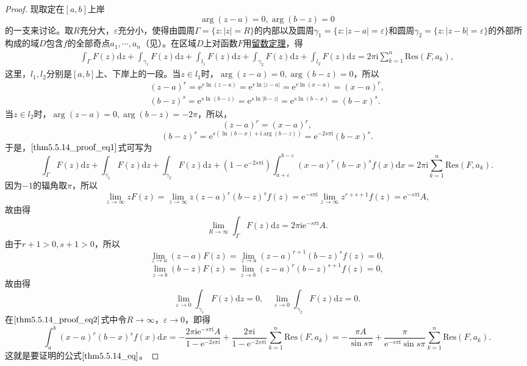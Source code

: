 \documentclass[../../main.tex]{subfiles}%
\begin{document}
\begin{proof}
现取定在\([a, b]\)上岸
\[
\arg(z - a) = 0, \arg(b - z) = 0
\]
的一支来讨论。取\( R \)充分大，\( \varepsilon \)充分小，使得由圆周\( \Gamma = \{ z : |z| = R \} \)的内部以及圆周\( \gamma_1 = \{ z : |z - a| = \varepsilon \} \)和圆周\( \gamma_2 = \{ z : |z - b| = \varepsilon \} \)的外部所构成的域\( D \)包含\( f \)的全部奇点\( a_1, \cdots, a_n \)（见）。在区域\( D \)上对函数\( F \)用\hyperref[theorem:留数定理(残数定理)-定理5.4.9]{留数定理}，得
\begin{align}
\int_{\Gamma} F(z) \mathrm{d}z + \int_{\gamma_1} F(z) \mathrm{d}z + \int_{l_1} F(z) \mathrm{d}z + \int_{\gamma_2} F(z) \mathrm{d}z + \int_{l_2} F(z) \mathrm{d}z
= 2\pi \mathrm{i} \sum_{k = 1}^{n} \mathrm{Res}(F, a_k), \label{thm5.5.14_proof_eq1}
\end{align}
这里，\( l_1, l_2 \)分别是\([a, b]\)上、下岸上的一段。当\( z \in l_1 \)时，\(\arg(z - a) = 0, \arg(b - z) = 0\)，所以
\begin{gather*}
(z - a)^r = \mathrm{e}^{r \ln(z - a)} = \mathrm{e}^{r \ln|z - a|}
= \mathrm{e}^{r \ln(x - a)} = (x - a)^r,
\\
(b - z)^s = \mathrm{e}^{s \ln(b - z)} = \mathrm{e}^{s \ln|b - z|}
= \mathrm{e}^{s \ln(b - x)} = (b - x)^s.
\end{gather*}
当\( z \in l_2 \)时，\(\arg(z - a) = 0, \arg(b - z) = -2\pi\)，所以，
\[
(z - a)^r = (x - a)^r,
\]
\[
(b - z)^s = \mathrm{e}^{s(\ln(b - x) + \mathrm{i} \arg(b - z))}
= \mathrm{e}^{-2s\pi \mathrm{i}} (b - x)^s.
\]
于是，\(\eqref{thm5.5.14_proof_eq1}\)式可写为
\[
\int_{\Gamma} F(z) \mathrm{d}z + \int_{\gamma_1} F(z) \mathrm{d}z + \int_{\gamma_2} F(z) \mathrm{d}z
+ (1 - \mathrm{e}^{-2s\pi \mathrm{i}}) \int_{a + \varepsilon}^{b - \varepsilon} (x - a)^r (b - x)^s f(x) \mathrm{d}x
= 2\pi \mathrm{i} \sum_{k = 1}^{n} \mathrm{Res}(F, a_k). \label{thm5.5.14_proof_eq2}
\]
因为\(-1\)的辐角取\(\pi\)，所以
\[
\lim_{z \to \infty} z F(z) = \lim_{z \to \infty} z (z - a)^r (b - z)^s f(z)
= \mathrm{e}^{-s\pi \mathrm{i}} \lim_{z \to \infty} z^{r + s + 1} f(z)
= \mathrm{e}^{-s\pi \mathrm{i}} A,
\]
故由得
\[
\lim_{R \to \infty} \int_{\Gamma} F(z) \mathrm{d}z = 2\pi \mathrm{i} \mathrm{e}^{-s\pi \mathrm{i}} A.
\]
由于\( r + 1 > 0, s + 1 > 0 \)，所以
\[
\lim_{z \to a} (z - a) F(z) = \lim_{z \to a} (z - a)^{r + 1} (b - z)^s f(z)
= 0,
\]
\[
\lim_{z \to b} (b - z) F(z) = \lim_{z \to b} (z - a)^r (b - z)^{s + 1} f(z)
= 0,
\]
故由得
\[
\lim_{\varepsilon \to 0} \int_{\gamma_1} F(z) \mathrm{d}z = 0,
\quad
\lim_{\varepsilon \to 0} \int_{\gamma_2} F(z) \mathrm{d}z = 0.
\]
在\(\eqref{thm5.5.14_proof_eq2}\)式中令\( R \to \infty \)，\( \varepsilon \to 0 \)，即得
\[
\int_{a}^{b} (x - a)^r (b - x)^s f(x) \mathrm{d}x
= -\frac{2\pi \mathrm{i} \mathrm{e}^{-s\pi \mathrm{i}} A}{1 - \mathrm{e}^{-2s\pi \mathrm{i}}} + \frac{2\pi \mathrm{i}}{1 - \mathrm{e}^{-2s\pi \mathrm{i}}} \sum_{k = 1}^{n} \mathrm{Res}(F, a_k)
= -\frac{\pi A}{\sin s\pi} + \frac{\pi}{\mathrm{e}^{-s\pi \mathrm{i}} \sin s\pi} \sum_{k = 1}^{n} \mathrm{Res}(F, a_k).
\]
这就是要证明的公式\(\eqref{thm5.5.14_eq}\)。

\end{proof}
\end{document}
